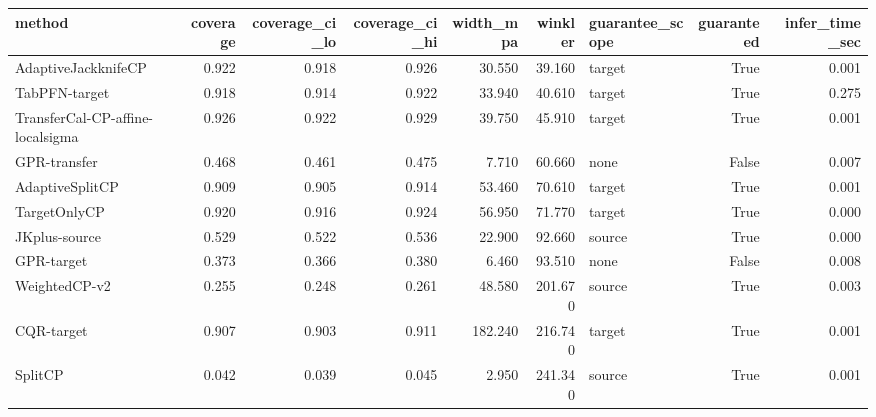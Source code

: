 \begin{tabular}{lrrrrrlrr}
\toprule
method & coverage & coverage_ci_lo & coverage_ci_hi & width_mpa & winkler & guarantee_scope & guaranteed & infer_time_sec \\
\midrule
AdaptiveJackknifeCP & 0.922 & 0.918 & 0.926 & 30.550 & 39.160 & target & True & 0.001 \\
TabPFN-target & 0.918 & 0.914 & 0.922 & 33.940 & 40.610 & target & True & 0.275 \\
TransferCal-CP-affine-localsigma & 0.926 & 0.922 & 0.929 & 39.750 & 45.910 & target & True & 0.001 \\
GPR-transfer & 0.468 & 0.461 & 0.475 & 7.710 & 60.660 & none & False & 0.007 \\
AdaptiveSplitCP & 0.909 & 0.905 & 0.914 & 53.460 & 70.610 & target & True & 0.001 \\
TargetOnlyCP & 0.920 & 0.916 & 0.924 & 56.950 & 71.770 & target & True & 0.000 \\
JKplus-source & 0.529 & 0.522 & 0.536 & 22.900 & 92.660 & source & True & 0.000 \\
GPR-target & 0.373 & 0.366 & 0.380 & 6.460 & 93.510 & none & False & 0.008 \\
WeightedCP-v2 & 0.255 & 0.248 & 0.261 & 48.580 & 201.670 & source & True & 0.003 \\
CQR-target & 0.907 & 0.903 & 0.911 & 182.240 & 216.740 & target & True & 0.001 \\
SplitCP & 0.042 & 0.039 & 0.045 & 2.950 & 241.340 & source & True & 0.001 \\
\bottomrule
\end{tabular}
